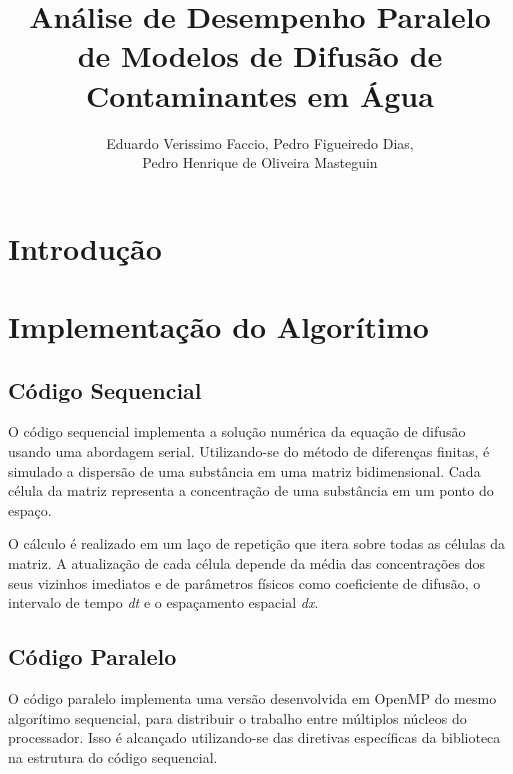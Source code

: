 \documentclass[12pt]{article}
\title{Análise de Desempenho Paralelo de Modelos de Difusão de Contaminantes em Água}
\author{Eduardo Verissimo Faccio, Pedro Figueiredo Dias, \\
Pedro Henrique de Oliveira Masteguin}
\begin{document}
 

\maketitle
     

\section{Introdução}


\section{Implementação do Algorítimo}

\subsection{Código Sequencial}

O código sequencial implementa a solução numérica da equação de difusão usando uma abordagem serial. Utilizando-se do método de diferenças finitas, é simulado a dispersão de uma substância em uma matriz bidimensional. Cada célula da matriz representa a concentração de uma substância em um ponto do espaço.

O cálculo é realizado em um laço de repetição que itera sobre todas as células da matriz. A atualização de cada célula depende da média das concentrações dos seus vizinhos imediatos e de parâmetros físicos como coeficiente de difusão, o intervalo de tempo \textit{dt} e o espaçamento espacial \textit{dx}.

\subsection{Código Paralelo}

O código paralelo implementa uma versão desenvolvida em OpenMP do mesmo algorítimo sequencial, para distribuir o trabalho entre múltiplos núcleos do processador. Isso é alcançado utilizando-se das diretivas específicas da biblioteca na estrutura do código sequencial.
\end{document}
